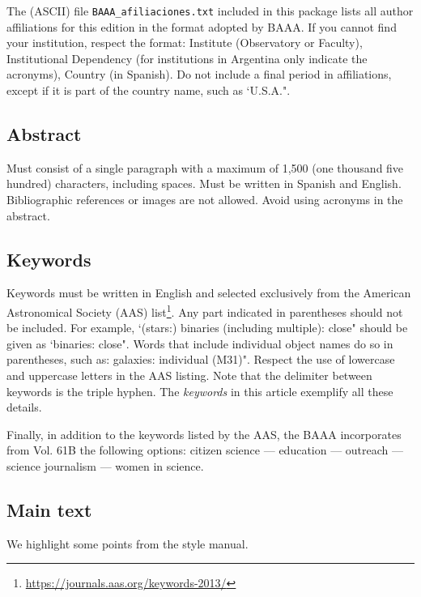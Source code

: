 \documentclass[baaa]{baaa}
\begin{document}
The ({\sc ASCII}) file {\tt BAAA\_afiliaciones.txt} included in this package lists all author affiliations for this edition in the format adopted by BAAA. If you cannot find your institution, respect the format: Institute (Observatory or Faculty), Institutional Dependency (for institutions in Argentina only indicate the acronyms), Country (in Spanish). Do not include a final period in affiliations, except if it is part of the country name, such as `U.S.A.".

\subsection{Abstract}

Must consist of a single paragraph with a maximum of 1,500 (one thousand five hundred) characters, including spaces. Must be written in Spanish and English. Bibliographic references or images are not allowed. Avoid using acronyms in the abstract.

\subsection{Keywords}

Keywords must be written in English and selected exclusively from the American Astronomical Society (AAS) list\footnote{\url{https://journals.aas.org/keywords-2013/}}. Any part indicated in parentheses should not be included. For example, `(stars:) binaries (including multiple): close" should be given as `binaries: close". Words that include individual object names do so in parentheses, such as: galaxies: individual (M31)". Respect the use of lowercase and uppercase letters in the AAS listing. Note that the delimiter between keywords is the triple hyphen. The {\em keywords} in this article exemplify all these details.

Finally, in addition to the keywords listed by the AAS, the BAAA incorporates from Vol. 61B the following options: {citizen science --- education --- outreach --- science journalism --- women in science}.

\subsection{Main text}

We highlight some points from the style manual.
\end{document}
